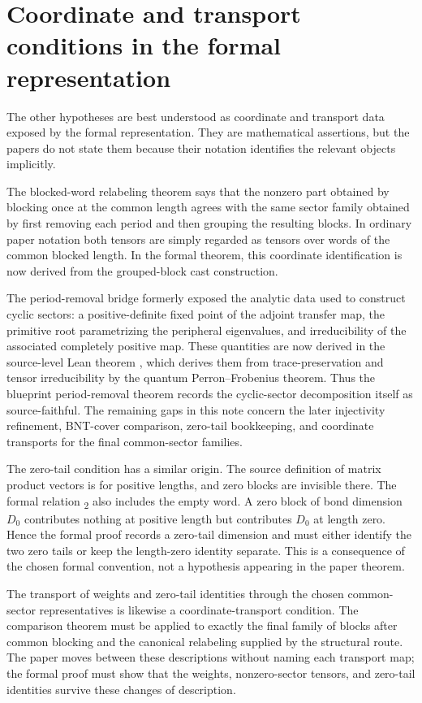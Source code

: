 \documentclass{article}
\begin{document}
\section{Coordinate and transport conditions in the formal representation}

The other hypotheses are best understood as coordinate and transport data exposed
by the formal representation. They are mathematical assertions, but the papers do
not state them because their notation identifies the relevant objects implicitly.

The blocked-word relabeling theorem says that the nonzero part obtained by
blocking once at the common length agrees with the same sector family obtained by
first removing each period and then grouping the resulting blocks. In ordinary
paper notation both tensors are simply regarded as tensors over words of the
common blocked length. In the formal theorem, this coordinate identification is
now derived from the grouped-block cast construction.

The period-removal bridge formerly exposed the analytic data used to construct
cyclic sectors: a positive-definite fixed point of the adjoint transfer map, the
primitive root parametrizing the peripheral eigenvalues, and irreducibility of
the associated completely positive map. These quantities are now derived in the
source-level Lean theorem
,
which derives them from trace-preservation and tensor irreducibility by the
quantum Perron--Frobenius theorem. Thus the blueprint period-removal theorem
records the cyclic-sector decomposition itself as source-faithful. The
remaining gaps in this note concern the later injectivity refinement, BNT-cover
comparison, zero-tail bookkeeping, and coordinate transports for the final
common-sector families.

The zero-tail condition has a similar origin. The source definition of matrix
product vectors is for positive lengths, and zero blocks are invisible there.
The formal relation \textsubscript{2} also includes the empty word. A zero
block of bond dimension $D_0$ contributes nothing at positive length but
contributes $D_0$ at length zero. Hence the formal proof records a zero-tail
dimension and must either identify the two zero tails or keep the length-zero
identity separate. This is a consequence of the chosen formal convention, not a
hypothesis appearing in the paper theorem.

The transport of weights and zero-tail identities through the chosen common-sector
representatives is likewise a coordinate-transport condition. The comparison theorem must be
applied to exactly the final family of blocks after common blocking and the
canonical relabeling supplied by the structural route.
The paper moves between these descriptions without naming each transport map; the
formal proof must show that the weights, nonzero-sector tensors, and zero-tail
identities survive these changes of description.
\end{document}
